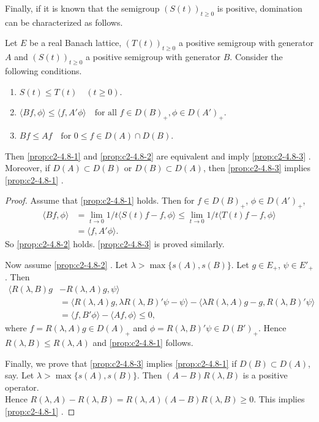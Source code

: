 Finally, if it is known that the semigroup $(S(t))_{t \geq 0}$ is positive,
domination can be characterized as follows.

\begin{proposition}\label{prop:c2-4.8}
Let $E$ be a real Banach lattice, $(T(t))_{t \geq 0}$ a
positive semigroup with generator $A$ and $(S(t))_{t \geq 0}$ a positive
semigroup with generator $B$. Consider the following conditions.
\begin{enumerate}[\upshape (a)]
\item \label{prop:c2-4.8-1}
$S(t) \leq T(t) \quad (t \geq 0)$.
\item \label{prop:c2-4.8-2}
$\langle Bf,\phi\rangle \leq \langle f,A'\phi\rangle \quad \text{for all } f \in D(B)_{+}, \phi \in D(A')_{+}$.
\item \label{prop:c2-4.8-3}
$Bf \leq Af \quad \text{for } 0 \leq f \in D(A) \cap D(B)$.
\end{enumerate}
Then \ref{prop:c2-4.8-1} and \ref{prop:c2-4.8-2}  are equivalent and imply \ref{prop:c2-4.8-3}  .
Moreover, if $D(A) \subset D(B)$ or $D(B) \subset D(A)$, then \ref{prop:c2-4.8-3}   implies \ref{prop:c2-4.8-1}  .
\end{proposition}

\begin{proof}
Assume that \ref{prop:c2-4.8-1}   holds. 
Then for $f \in D(B)_{+}$, $\phi \in D(A')_{+}$,
\begin{align*}
\langle Bf,\phi\rangle &= \lim_{t \to 0} 1/t \langle S(t)f - f, \phi\rangle \leq \lim_{t \to 0} 1/t \langle T(t)f - f, \phi\rangle\\
&= \langle f, A'\phi\rangle.
\end{align*}
So \ref{prop:c2-4.8-2}   holds. 
\ref{prop:c2-4.8-3}   is proved similarly.

Now assume \ref{prop:c2-4.8-2}  . 
Let $\lambda > \max \{s(A), s(B)\}$. Let $g \in E_{+}$, $\psi \in E'_{+}$.
Then 
\begin{align*}
\langle R(\lambda,B)g &- R(\lambda,A)g, \psi\rangle\\
&= \langle R(\lambda,A)g, \lambda R(\lambda,B)'\psi - \psi\rangle - \langle \lambda R(\lambda,A)g - g, R(\lambda,B)'\psi\rangle\\
&= \langle f, B'\phi\rangle - \langle Af, \phi\rangle \leq 0,
\end{align*}
where $f = R(\lambda,A)g \in D(A)_{+}$ and $\phi = R(\lambda,B)'\psi \in D(B')_{+}$. 
Hence $R(\lambda,B) \leq R(\lambda,A)$ and \ref{prop:c2-4.8-1}   follows.

Finally, we prove that \ref{prop:c2-4.8-3}   implies  \ref{prop:c2-4.8-1}   if $D(B) \subset D(A)$, say.
Let $\lambda > \max\{s(A),s(B)\}$. 
Then $(A - B)R(\lambda,B)$ is a positive operator.\\
Hence $R(\lambda,A) - R(\lambda,B) = R(\lambda,A)(A - B)R(\lambda,B) \geq 0$. 
This implies \ref{prop:c2-4.8-1}  .
\end{proof}

